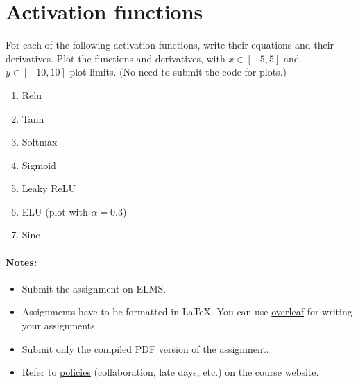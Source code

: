 \documentclass[11pt]{article}
\begin{document}
\section{Activation functions}
For each of the following activation functions, write their equations and their derivatives. Plot the functions and derivatives, with $x\in \left[-5, 5\right]$ and $y\in\left[-10,10\right]$ plot limits. (No need to submit the code for plots.)

\begin{enumerate}
    \item Relu
    \item Tanh
    \item Softmax
    \item Sigmoid
    \item Leaky ReLU
    \item ELU (plot with $\alpha=0.3$)
    \item Sinc
\end{enumerate}

\vspace{20pt}

\paragraph{Notes:}
\begin{itemize}
    \item Submit the assignment on ELMS.
    \item Assignments have to be formatted in \LaTeX. You can use \href{https://www.overleaf.com/}{overleaf} for writing your assignments.
    \item Submit only the compiled PDF version of the assignment.
    \item Refer to \href{http://www.cs.umd.edu/class/spring2020/cmsc498L/#policy}{policies} (collaboration, late days, etc.) on the course website.
\end{itemize}
\end{document}

